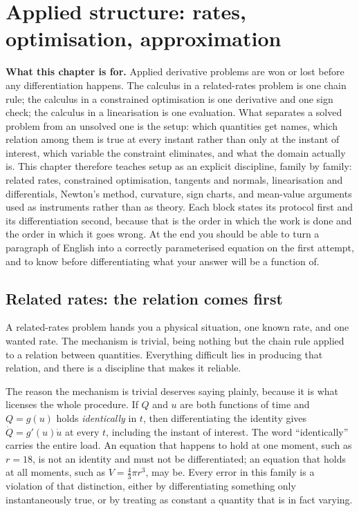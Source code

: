 \chapter{Applied structure: rates, optimisation, approximation}

\begin{orient}
\textbf{What this chapter is for.} Applied derivative problems are won or lost before any differentiation happens. The calculus in a related-rates problem is one chain rule; the calculus in a constrained optimisation is one derivative and one sign check; the calculus in a linearisation is one evaluation. What separates a solved problem from an unsolved one is the setup: which quantities get names, which relation among them is true at every instant rather than only at the instant of interest, which variable the constraint eliminates, and what the domain actually is. This chapter therefore teaches setup as an explicit discipline, family by family: related rates, constrained optimisation, tangents and normals, linearisation and differentials, Newton's method, curvature, sign charts, and mean-value arguments used as instruments rather than as theory. Each block states its protocol first and its differentiation second, because that is the order in which the work is done and the order in which it goes wrong. At the end you should be able to turn a paragraph of English into a correctly parameterised equation on the first attempt, and to know before differentiating what your answer will be a function of.
\end{orient}

\section{Related rates: the relation comes first}

A related-rates problem hands you a physical situation, one known rate, and one wanted rate. The mechanism is trivial, being nothing but the chain rule applied to a relation between quantities. Everything difficult lies in producing that relation, and there is a discipline that makes it reliable.

The reason the mechanism is trivial deserves saying plainly, because it is what licenses the whole procedure. If $Q$ and $u$ are both functions of time and $Q=g(u)$ holds \emph{identically} in $t$, then differentiating the identity gives $\dot Q=g'(u)\dot u$ at every $t$, including the instant of interest. The word ``identically'' carries the entire load. An equation that happens to hold at one moment, such as $r=18$, is not an identity and must not be differentiated; an equation that holds at all moments, such as $V=\tfrac43\pi r^{3}$, may be. Every error in this family is a violation of that distinction, either by differentiating something only instantaneously true, or by treating as constant a quantity that is in fact varying.

